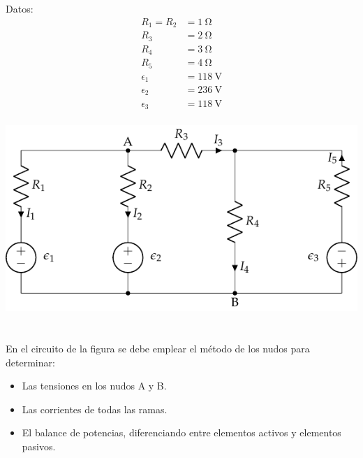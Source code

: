 \documentclass[10pt]{article}
\begin{document}
\begin{minipage}{0.4\linewidth}
  Datos:
  \begin{align*}
    R_1 = R_2 &= \SI{1}{\ohm}\\
    R_3 &= \SI{2}{\ohm}\\
    R_4 &= \SI{3}{\ohm}\\
    R_5 &= \SI{4}{\ohm}\\
    \epsilon_1 &= \SI{118}{\volt}\\
    \epsilon_2 &= \SI{236}{\volt}\\
    \epsilon_3 &= \SI{118}{\volt}\\
  \end{align*}
\end{minipage}
\begin{minipage}{0.6\linewidth}
  \includegraphics{figs/mallas2.pdf}
\end{minipage}


\clearpage

\section{}

En el circuito de la figura se debe emplear el método de los nudos para determinar:
\begin{itemize}
\item Las tensiones en los nudos A y B.
\item Las corrientes de todas las ramas.
\item El balance de potencias, diferenciando entre elementos activos y elementos pasivos.
\end{itemize}
\end{document}
